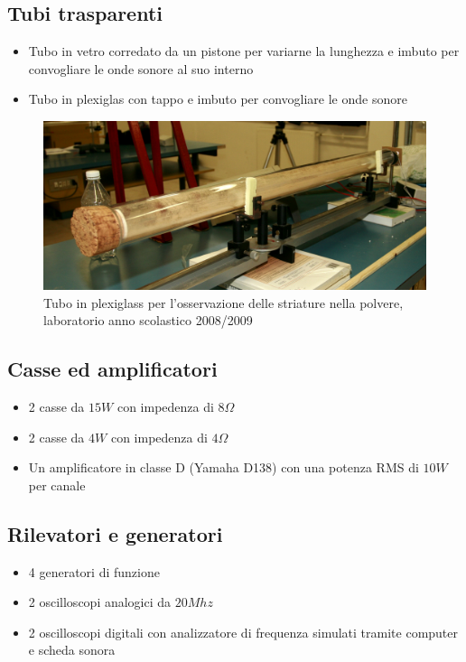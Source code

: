 \documentclass[a4paper,10pt,oneside]{article}
\begin{document}
\subsection{Tubi trasparenti}
\begin{itemize}
 \item Tubo in vetro corredato da un pistone per variarne la lunghezza e imbuto per convogliare le onde sonore al suo interno
\item Tubo in plexiglas con tappo e imbuto per convogliare le onde sonore
\end{itemize}


\begin{figure}[H]
 \centering
 \includegraphics[width=\textwidth]{../Immagini/tubo_plexiglass.jpg}
 \caption{Tubo in plexiglass per l'osservazione delle striature nella polvere, laboratorio anno scolastico 2008/2009}
 \label{fig:tubo_plexiglass}
\end{figure}


\subsection{Casse ed amplificatori}

\begin{itemize}
 \item 2 casse da $15W$ con impedenza di $8\Omega$
 \item 2 casse da $4W$ con impedenza di $4\Omega$
\item Un amplificatore in classe D (Yamaha D138) con una potenza RMS di $10W$ per canale
\end{itemize}

\subsection{Rilevatori e generatori}
\begin{itemize}
 \item 4 generatori di funzione
\item 2 oscilloscopi analogici da $20Mhz$
\item 2 oscilloscopi digitali con analizzatore di frequenza simulati tramite computer e scheda sonora
\end{itemize}
\end{document}
